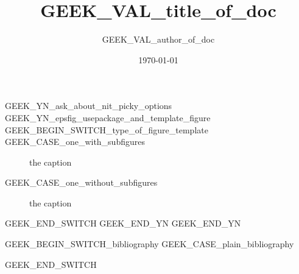 \documentclass{article}
\title{GEEK_VAL_title_of_doc}
\author{GEEK_VAL_author_of_doc}
\date{\today}
\begin{document}
\maketitle

GEEK_YN_ask_about_nit_picky_options
    GEEK_YN_epsfig_usepackage_and_template_figure
    GEEK_BEGIN_SWITCH_type_of_figure_template
    GEEK_CASE_one_with_subfigures
    \begin{figure}[h!]
        \begin{center}

        \caption{the caption}
        \label{the label}
        \end{center}
    \end{figure}
    GEEK_CASE_one_without_subfigures
    \begin{figure}[h!]
        \begin{center}
        \caption{the caption}
        \label{the label}
        \end{center}
    \end{figure}
    GEEK_END_SWITCH
    GEEK_END_YN
GEEK_END_YN

    GEEK_BEGIN_SWITCH_bibliography
        GEEK_CASE_plain_bibliography

    GEEK_END_SWITCH
\end{document}
